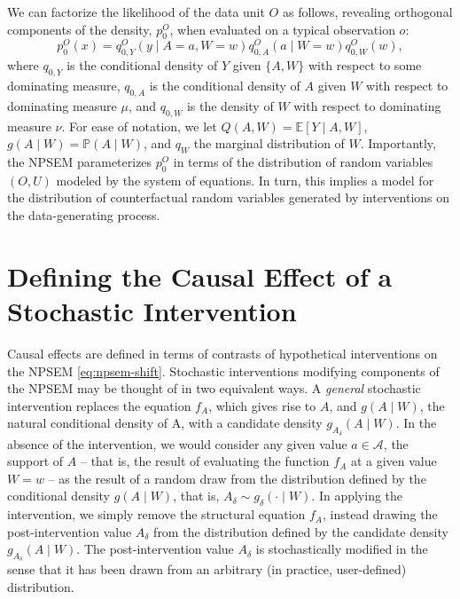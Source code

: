 \documentclass[
  12pt, krantz2,
]{krantz}
\theoremstyle{definition}
\theoremstyle{definition}
\theoremstyle{definition}
\renewcommand{\P}{\mathbb{P}}
\newcommand{\E}{\mathbb{E}}
\newcommand{\1}{\mathbbm{1}}
\begin{document}
We can factorize the likelihood of the data unit \(O\) as follows, revealing
orthogonal components of the density, \(p_0^O\), when evaluated on a typical
observation \(o\):
\begin{equation}
  p_0^O(x) = q^O_{0,Y}(y \mid A = a, W = w) q^O_{0,A}(a \mid W = w)
  q^O_{0,W}(w),
  \label{eq:likelihood-factorization-shift}
\end{equation}
where \(q_{0, Y}\) is the conditional density of \(Y\) given \(\{A, W\}\) with respect
to some dominating measure, \(q_{0, A}\) is the conditional density of \(A\) given
\(W\) with respect to dominating measure \(\mu\), and \(q_{0, W}\) is the density of
\(W\) with respect to dominating measure \(\nu\). For ease of notation, we let
\(Q(A, W) = \E[Y \mid A, W]\), \(g(A \mid W) = \P(A \mid W)\), and \(q_W\) the
marginal distribution of \(W\). Importantly, the NPSEM parameterizes \(p_0^O\) in
terms of the distribution of random variables \((O, U)\) modeled by the system of
equations. In turn, this implies a model for the distribution of counterfactual
random variables generated by interventions on the data-generating process.

\hypertarget{defining-the-causal-effect-of-a-stochastic-intervention}{%
\section{Defining the Causal Effect of a Stochastic Intervention}\label{defining-the-causal-effect-of-a-stochastic-intervention}}

Causal effects are defined in terms of contrasts of hypothetical interventions
on the NPSEM \eqref{eq:npsem-shift}. Stochastic interventions modifying
components of the NPSEM may be thought of in two equivalent ways. A \emph{general}
stochastic intervention replaces the equation \(f_A\), which gives rise to \(A\),
and \(g(A \mid W)\), the natural conditional density of A, with a candidate
density \(g_{A_{\delta}}(A \mid W)\). In the absence of the intervention, we would
consider any given value \(a \in \mathcal{A}\), the support of \(A\) -- that is, the
result of evaluating the function \(f_A\) at a given value \(W = w\) -- as the
result of a random draw from the distribution defined by the conditional density
\(g(A \mid W)\), that is, \(A_{\delta} \sim g_{\delta}(\cdot \mid W)\). In applying
the intervention, we simply remove the structural equation \(f_A\), instead
drawing the post-intervention value \(A_{\delta}\) from the distribution defined
by the candidate density \(g_{A_{\delta}}(A \mid W)\). The post-intervention value
\(A_{\delta}\) is stochastically modified in the sense that it has been drawn from
an arbitrary (in practice, user-defined) distribution.
\end{document}
